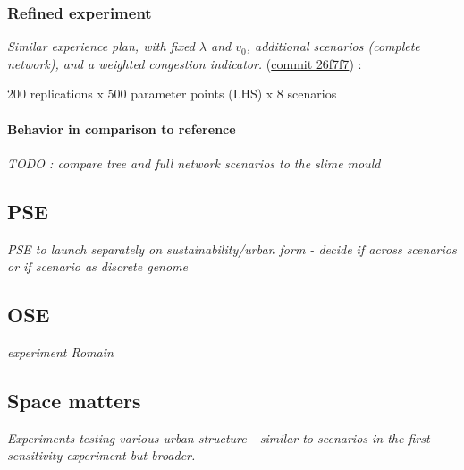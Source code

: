 \subsubsection{Refined experiment}

\textit{Similar experience plan, with fixed $\lambda$ and $v_0$, additional scenarios (complete network), and a weighted congestion indicator.} (\href{https://github.com/JusteRaimbault/Governance/commit/26f7f77b9a4fc378a0985de4493fe94a50846ce4}{commit 26f7f7}) :

200 replications x 500 parameter points (LHS) x 8 scenarios






\paragraph{Behavior in comparison to reference}

\textit{TODO : compare tree and full network scenarios to the slime mould}




\subsection{PSE}

\textit{PSE to launch separately on sustainability/urban form - decide if across scenarios or if scenario as discrete genome}


\subsection{OSE}

\textit{experiment Romain}



\subsection{Space matters}

\textit{Experiments testing various urban structure - similar to scenarios in the first sensitivity experiment but broader.}










